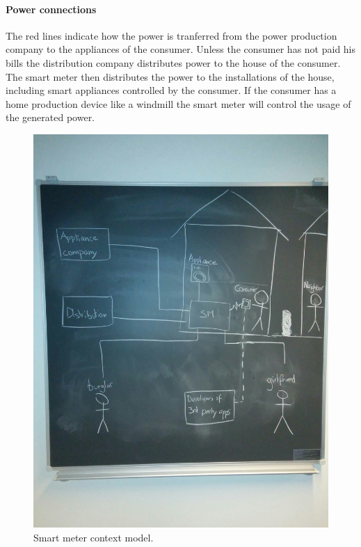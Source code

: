 \paragraph{Power connections}
The red lines indicate how the power is tranferred from the power production company to the appliances of the consumer.
Unless the consumer has not paid his bills the distribution company distributes power to the house of the consumer.
The smart meter then distributes the power to the installations of the house, including smart appliances controlled by the consumer.
If the consumer has a home production device like a windmill the smart meter will control the usage of the generated power.

\begin{figure}
  \includegraphics[width=\textwidth]{figures/situation.jpg}
  \caption{Smart meter context model.}
  \label{sm_model}
\end{figure}

